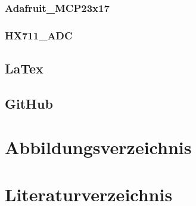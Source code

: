 \documentclass[ngerman,12pt,a4paper]{article}
\begin{document}
			\subsubsection*{Adafruit\_MCP23x17}
			
			\subsubsection*{HX711\_ADC}
				
	 \subsection{LaTex}
	 
	 \subsection{GitHub}
	 
\newpage
	
	\section{Abbildungsverzeichnis}
	
		\listoffigures
\newpage
	\section{Literaturverzeichnis}
	 
\end{document}
